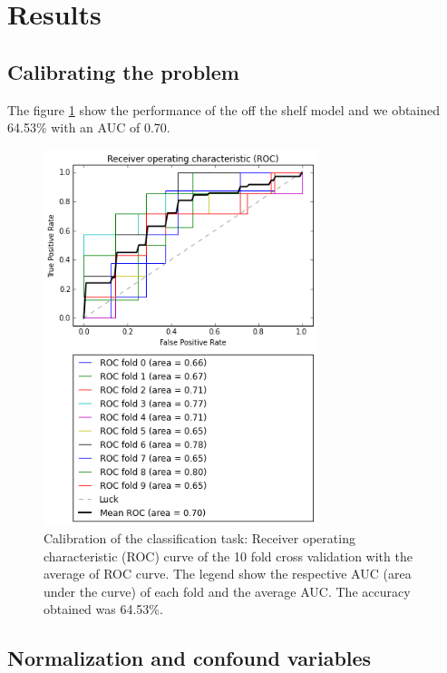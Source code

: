 \documentclass[12pt,journal,compsoc]{IEEEtran}
\begin{document}
\section{Results}

\subsection{Calibrating the problem}

 The figure \ref{fig_calib_svm} show the performance of the off the shelf model and we obtained 64.53\% with an AUC of 0.70.
 
\begin{figure}[h]
\centering
\includegraphics[width=8cm]{svc_linear_calibration_scale64x64.png}
\caption{Calibration of the classification task: Receiver operating characteristic (ROC) curve of the 10 fold cross validation with the average of ROC curve. The legend show the respective AUC (area under the curve) of each fold and the average AUC. The accuracy obtained was 64.53\%.}
\label{fig_calib_svm}
\end{figure}


\subsection{Normalization and confound variables}


\end{document}

